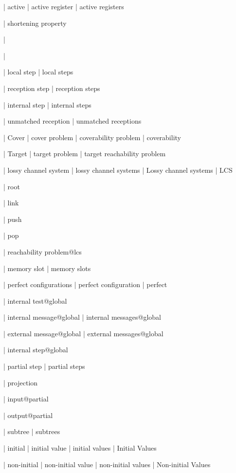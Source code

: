 
| active
| active register
| active registers

| shortening property

| \memoryproj

| \memoryproj

| local step
| local steps

| reception step
| reception steps

| internal step
| internal steps

| unmatched reception
| unmatched receptions




| Cover
| cover problem
| coverability problem
| coverability

| Target
| target problem
| target reachability problem


| lossy channel system
| lossy channel systems
| Lossy channel systems
| LCS

| root

| link

| push

| pop

| reachability problem@lcs


| memory slot
| memory slots

| perfect configurations
| perfect configuration
| perfect


| internal test@global

| internal message@global
| internal messages@global

| external message@global
| external messages@global

| internal step@global

| partial step
| partial steps

| projection

| input@partial

| output@partial

| subtree
| subtrees

| initial
| initial value
| initial values
| Initial Values

| non-initial
| non-initial value
| non-initial values
| Non-initial Values